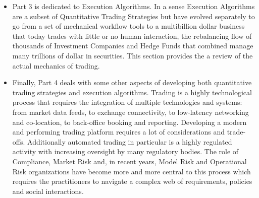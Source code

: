 \begin{itemize}
\item Part 3 is dedicated to Execution Algorithms. In a sense Execution Algorithms are a subset of Quantitative Trading Strategies but have evolved separately to go from a set of mechanical workflow tools to a multibillion dollar business that today trades with little or no human interaction, the rebalancing flow of thousands of Investment Companies and Hedge Funds that combined manage many trillions of dollar in securities. This section provides the a review of the actual mechanics of trading. 

\item Finally, Part 4 deals with some other aspects of developing both quantitative trading strategies and execution algorithms. Trading is a highly technological process that requires the integration of multiple technologies and systems: from market data feeds, to exchange connectivity, to low-latency networking and co-location, to back-office booking and reporting. Developing a modern and performing trading platform requires a lot of considerations and trade-offs. Additionally automated trading in particular is a highly regulated activity with increasing oversight by many regulatory bodies. The role of Compliance, Market Risk and, in recent years, Model Risk and Operational Risk organizations have become more and more central to this process which requires the practitioners to navigate a  complex web of requirements, policies and social interactions.
\end{itemize}


